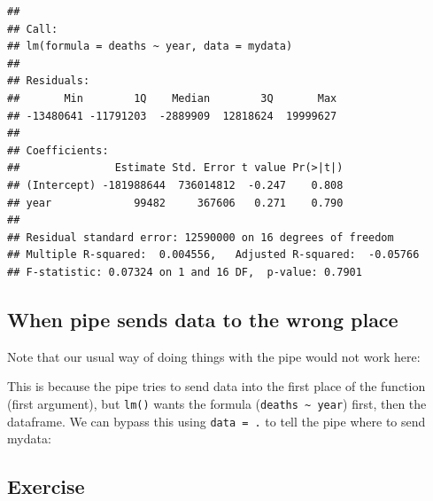 \documentclass[]{book}
\makeatletter
\newenvironment{Shaded}{\begin{snugshade}}{\end{snugshade}}
\newcommand{\KeywordTok}[1]{\textcolor[rgb]{0.13,0.29,0.53}{\textbf{#1}}}
\newcommand{\DataTypeTok}[1]{\textcolor[rgb]{0.13,0.29,0.53}{#1}}
\newcommand{\StringTok}[1]{\textcolor[rgb]{0.31,0.60,0.02}{#1}}
\newcommand{\OperatorTok}[1]{\textcolor[rgb]{0.81,0.36,0.00}{\textbf{#1}}}
\newcommand{\NormalTok}[1]{#1}
\newenvironment{kframe}{%
\medskip{}
\setlength{\fboxsep}{.8em}
 \def\at@end@of@kframe{}%
 \ifinner\ifhmode%
  \def\at@end@of@kframe{\end{minipage}}%
  \begin{minipage}{\columnwidth}%
 \fi\fi%
 \def\FrameCommand##1{\hskip\@totalleftmargin \hskip-\fboxsep
 \colorbox{shadecolor}{##1}\hskip-\fboxsep
     \hskip-\linewidth \hskip-\@totalleftmargin \hskip\columnwidth}%
 \MakeFramed {\advance\hsize-\width
   \@totalleftmargin\z@ \linewidth\hsize
   \@setminipage}}%
 {\par\unskip\endMakeFramed%
 \at@end@of@kframe}
\renewenvironment{Shaded}{\begin{kframe}}{\end{kframe}}
\makeatother
\begin{document}
\begin{verbatim}
## 
## Call:
## lm(formula = deaths ~ year, data = mydata)
## 
## Residuals:
##       Min        1Q    Median        3Q       Max 
## -13480641 -11791203  -2889909  12818624  19999627 
## 
## Coefficients:
##               Estimate Std. Error t value Pr(>|t|)
## (Intercept) -181988644  736014812  -0.247    0.808
## year             99482     367606   0.271    0.790
## 
## Residual standard error: 12590000 on 16 degrees of freedom
## Multiple R-squared:  0.004556,   Adjusted R-squared:  -0.05766 
## F-statistic: 0.07324 on 1 and 16 DF,  p-value: 0.7901
\end{verbatim}

\subsection{When pipe sends data to the wrong
place}\label{when-pipe-sends-data-to-the-wrong-place}

Note that our usual way of doing things with the pipe would not work
here:

\begin{Shaded}
\end{Shaded}

This is because the pipe tries to send data into the first place of the
function (first argument), but \texttt{lm()} wants the formula
(\texttt{deaths\ \textasciitilde{}\ year}) first, then the dataframe. We
can bypass this using \texttt{data\ =\ .} to tell the pipe where to send
mydata:

\begin{Shaded}
\end{Shaded}

\subsection{Exercise}\label{exercise-14}
\end{document}
